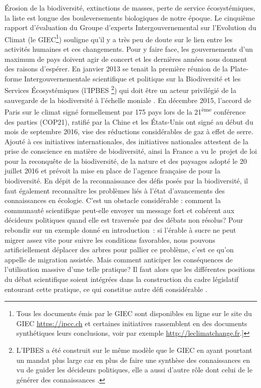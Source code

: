 Érosion de la biodiversité, extinctions de masses, perte de service
écosystémiques, la liste est longue des bouleversements biologiques de
notre époque. Le cinquième rapport d'évaluation du Groupe d'experts
Intergouvernemental sur l'Evolution du Climat (le GIEC\footnote{Tous les
  documents émis par le GIEC sont disponibles en ligne sur le site du
  GIEC \url{https://ipcc.ch} et certaines initiatives rassemblent en des
  documents synthétiques leurs conclusions, voir par exemple
  \url{http://leclimatchange.fr}.{]}}) souligne qu'il y a très peu de
doute sur le lien entre les activités humaines et ces changements. Pour
y faire face, les gouvernements d'un maximum de pays doivent agir de
concert et les dernières années nous donnent des raisons d'espérer. En
janvier 2013 se tenait la première réunion de la Plate-forme
Intergouvernementale scientifique et politique sur la Biodiversité et
les Services Écosystémiques (l'IPBES \footnote{L'IPBES a été construit
  sur le même modèle que le GIEC en ayant pourtant un mandat plus large
  car en plus de faire une synthèse des connaissances en vu de guider
  les décideurs politiques, elle a aussi d'autre rôle dont celui de le
  générer des connaissances \citep{Brooks2014}.}) qui doit être un
acteur privilégié de la sauvegarde de la biodiversité à l'échelle
moniale \citep{Diaz2015a}. En décembre 2015, l'accord de Paris sur le
climat signé formellement par 175 pays lors de la
21\textsuperscript{ème} conférence des parties (COP21), ratifié par la
Chine et les États-Unis ont signé au début du mois de septembre 2016,
vise des réductions considérables de gaz à effet de serre. Ajouté à ces
initiatives internationales, des initiatives nationales attestent de la
prise de conscience en matière de biodiversité, ainsi la France a vu
le~projet de loi pour la reconquête de la biodiversité, de la nature et
des paysages adopté le 20 juillet 2016 et prévoit la mise en place de
l'agence française de pour la biodiversité. En dépit de la
reconnaissance des défis posés par la biodiversité, il faut également
reconnaître les problèmes liés à l'état d'avancements des connaissances
en écologie. C'est un obstacle considérable : comment la communauté
scientifique peut-elle envoyer un message fort et cohérent aux décideurs
politiques quand elle est traversée par des débats non résolus? Pour
rebondir sur un exemple donné en introduction~: si l'érable à sucre ne
peut migrer assez vite pour suivre les conditions favorables, nous
pouvons artificiellement déplacer des arbres pour pallier ce problème,
c'est ce qu'on appelle de migration assistée. Mais comment anticiper les
conséquences de l'utilisation massive d'une telle pratique? Il faut
alors que les différentes positions du débat scientifique soient
intégrées dans la construction du cadre législatif entourant cette
pratique, ce qui constitue autre défi considérable
\citep{McLachlan2007}.

